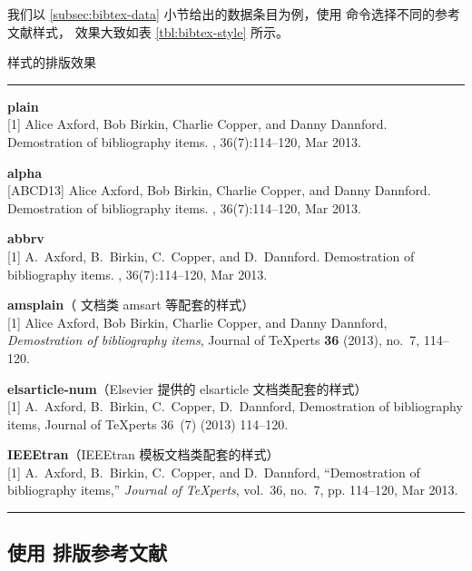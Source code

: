 我们以 \ref{subsec:bibtex-data} 小节给出的数据条目为例，使用  命令选择不同的参考文献样式，
效果大致如表 \ref{tbl:bibtex-style} 所示。

\begin{table}[htp]
\caption{ 样式的排版效果}\label{tbl:bibtex-style}
\hrule
\begin{trivlist}\item\relax
\textbf{plain}\\{}
[1] Alice Axford, Bob Birkin, Charlie Copper, and Danny Dannford.
\newblock Demostration of bibliography items.
, 36(7):114--120, Mar 2013.

\medskip
\textbf{alpha}\\{}
[ABCD13] Alice Axford, Bob Birkin, Charlie Copper, and Danny Dannford.
\newblock Demostration of bibliography items.
, 36(7):114--120, Mar 2013.

\medskip
\textbf{abbrv}\\{}
[1] A.~Axford, B.~Birkin, C.~Copper, and D.~Dannford.
\newblock Demostration of bibliography items.
, 36(7):114--120, Mar 2013.

\medskip
\textbf{amsplain}（\AmS{} 文档类 \textsf{amsart} 等配套的样式）\\{}
[1] Alice Axford, Bob Birkin, Charlie Copper, and Danny Dannford, \emph{Demostration of bibliography
  items}, Journal of \TeX perts \textbf{36} (2013), no.~7, 114--120.

\medskip
\textbf{elsarticle-num}（Elsevier 提供的 \textsf{elsarticle} 文档类配套的样式）\\{}
[1] A.~Axford, B.~Birkin, C.~Copper, D.~Dannford, Demostration of bibliography items,
  Journal of \TeX perts 36~(7) (2013) 114--120.

\medskip
\textbf{IEEEtran}（\textsf{IEEEtran} 模板文档类配套的样式）\\{}
[1] A.~Axford, B.~Birkin, C.~Copper, and D.~Dannford, ``Demostration of
  bibliography items,'' \emph{Journal of \TeX perts}, vol.~36, no.~7, pp.
  114--120, Mar 2013.
\end{trivlist}
\hrule
\end{table}

\subsection{使用  排版参考文献}\label{subsec:bibtex-use}

